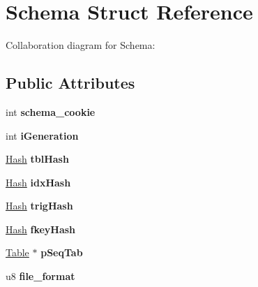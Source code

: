 \hypertarget{struct_schema}{\section{Schema Struct Reference}
\label{struct_schema}
}


Collaboration diagram for Schema\+:
\subsection*{Public Attributes}
\begin{DoxyCompactItemize}
\item 
\hypertarget{struct_schema_a3eef54a64f4f962d64577646bd34a47c}{int {\bfseries schema\+\_\+cookie}}\label{struct_schema_a3eef54a64f4f962d64577646bd34a47c}

\item 
\hypertarget{struct_schema_a879b1597656c7cbcbb98cdb88e876874}{int {\bfseries i\+Generation}}\label{struct_schema_a879b1597656c7cbcbb98cdb88e876874}

\item 
\hypertarget{struct_schema_af841eadc93b289944b95f72b784bfaae}{\hyperlink{struct_hash}{Hash} {\bfseries tbl\+Hash}}\label{struct_schema_af841eadc93b289944b95f72b784bfaae}

\item 
\hypertarget{struct_schema_ac0dd242f486d17ddadca1e47af76c6c5}{\hyperlink{struct_hash}{Hash} {\bfseries idx\+Hash}}\label{struct_schema_ac0dd242f486d17ddadca1e47af76c6c5}

\item 
\hypertarget{struct_schema_ab521f4545d200329d8e1a46bbb67e7c5}{\hyperlink{struct_hash}{Hash} {\bfseries trig\+Hash}}\label{struct_schema_ab521f4545d200329d8e1a46bbb67e7c5}

\item 
\hypertarget{struct_schema_ad51ed96351701cfe8d9e871722827c11}{\hyperlink{struct_hash}{Hash} {\bfseries fkey\+Hash}}\label{struct_schema_ad51ed96351701cfe8d9e871722827c11}

\item 
\hypertarget{struct_schema_ad580e4e662724bee95571d297f94da37}{\hyperlink{struct_table}{Table} $\ast$ {\bfseries p\+Seq\+Tab}}\label{struct_schema_ad580e4e662724bee95571d297f94da37}

\item 
\hypertarget{struct_schema_ab9f0371436e41b3080772995407a4cca}{u8 {\bfseries file\+\_\+format}}\label{struct_schema_ab9f0371436e41b3080772995407a4cca}


\end{DoxyCompactItemize}
